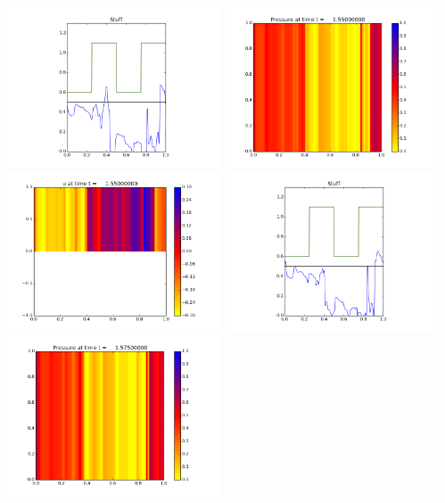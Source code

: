 \documentclass[11pt]{article}
\begin{document}
\vskip 10pt 
\includegraphics[width=0.475\textwidth]{frame0061fig3.png}
\vskip 10pt 
\includegraphics[width=0.475\textwidth]{frame0062fig0.png}
\includegraphics[width=0.475\textwidth]{frame0062fig1.png}
\vskip 10pt 
\includegraphics[width=0.475\textwidth]{frame0062fig3.png}
\vskip 10pt 
\includegraphics[width=0.475\textwidth]{frame0063fig0.png}
\end{document}
